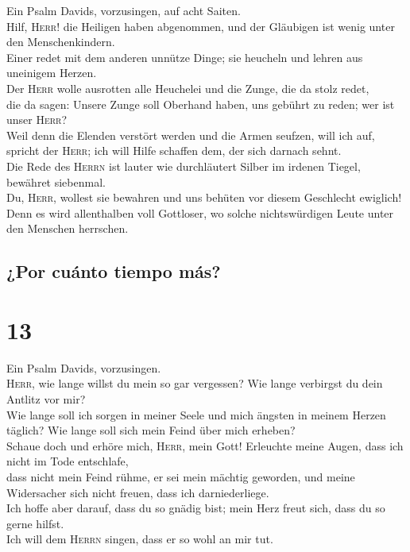  Ein Psalm Davids, vorzusingen, auf acht Saiten.\\
 Hilf, \textsc{Herr}! die Heiligen haben abgenommen, und
der Gläubigen ist wenig unter den Menschenkindern.\\
 Einer redet mit dem anderen unnütze Dinge; sie heucheln
und lehren aus uneinigem Herzen.\\
 Der \textsc{Herr} wolle ausrotten alle Heuchelei und die
Zunge, die da stolz redet,\\
 die da sagen: Unsere Zunge soll Oberhand haben, uns
gebührt zu reden; wer ist unser \textsc{Herr}?\\
 Weil denn die Elenden verstört werden und die Armen
seufzen, will ich auf, spricht der \textsc{Herr}; ich will Hilfe
schaffen dem, der sich darnach sehnt.\\
 Die Rede des \textsc{Herrn} ist lauter wie durchläutert
Silber im irdenen Tiegel, bewähret siebenmal.\\
 Du, \textsc{Herr}, wollest sie bewahren und uns behüten
vor diesem Geschlecht ewiglich!\\
 Denn es wird allenthalben voll Gottloser, wo solche
nichtswürdigen Leute unter den Menschen herrschen.

\hypertarget{por-cuuxe1nto-tiempo-muxe1s}{%
\subsection{¿Por cuánto tiempo más?}\label{por-cuuxe1nto-tiempo-muxe1s}}

\hypertarget{section-12}{%
\section{13}\label{section-12}}

 Ein Psalm Davids, vorzusingen.\\
 \textsc{Herr}, wie lange willst du mein so gar vergessen?
Wie lange verbirgst du dein Antlitz vor mir?\\
 Wie lange soll ich sorgen in meiner Seele und mich
ängsten in meinem Herzen täglich? Wie lange soll sich mein Feind über
mich erheben?\\
 Schaue doch und erhöre mich, \textsc{Herr}, mein Gott!
Erleuchte meine Augen, dass ich nicht im Tode entschlafe,\\
 dass nicht mein Feind rühme, er sei mein mächtig
geworden, und meine Widersacher sich nicht freuen, dass ich
darniederliege.\\
 Ich hoffe aber darauf, dass du so gnädig bist; mein Herz
freut sich, dass du so gerne hilfst.\\
 Ich will dem \textsc{Herrn} singen, dass er so wohl an
mir tut.

